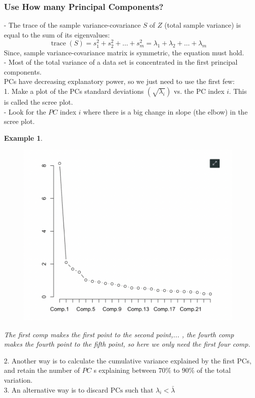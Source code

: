 \documentclass[11pt,a4paper]{article}
\newtheorem{example}{Example}
\begin{document}
\subsubsection{Use How many Principal Components?}
- The trace of the sample variance-covariance $S$ of $Z$ (total sample variance) is equal to the sum of its eigenvalues:
$$
\operatorname{trace}(S)=s_{1}^{2}+s_{2}^{2}+\ldots+s_{m}^{2}=\lambda_{1}+\lambda_{2}+\ldots+\lambda_{m}
$$
Since, sample variance-covariance matrix is symmetric, the equation must hold.\\
- Most of the total variance of a data set is concentrated in the first principal components.\\
PCs have decreasing explanatory power, so we just need to use the first few:\\
1. Make a plot of the PCs standard deviations $\left(\sqrt{\lambda_{i}}\right)$ vs. the PC index $i$. This is called the scree plot.\\
- Look for the $P C$ index $i$ where there is a big change in slope (the elbow) in the scree plot.\\
\begin{example}
\begin{center}\begin{figure}[htbp]
    \centering
    \includegraphics[scale=0.5]{elbow}
    \caption{}
    \label{}
\end{figure}\end{center}
The first comp makes the first point to the second point,... , the fourth comp makes the fourth point to the fifth point, so here we only need the first four comp.
\end{example}
2. Another way is to calculate the cumulative variance explained by the first PCs, and retain the number of $P C$ s explaining between $70 \%$ to $90 \%$ of the total variation.\\
3. An alternative way is to discard $\mathrm{PCs}$ such that $\lambda_{i}<\bar{\lambda}$
\end{document}
